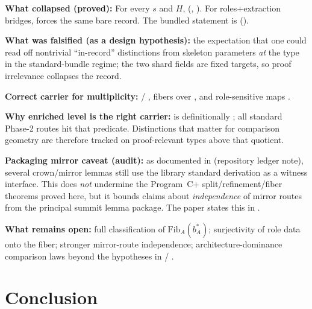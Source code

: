 \documentclass[11pt]{article}
\begin{document}
\begin{sloppypar}
\textbf{What collapsed (proved):} For every  $s$ and  $H$,  (, ). For roles+extraction bridges,  forces the same bare record. The bundled statement is  ().

\textbf{What was falsified (as a design hypothesis):} the expectation that one could read off nontrivial ``in-record'' distinctions from skeleton parameters \emph{at} the type  in the standard-bundle regime; the two  shard fields are fixed targets, so proof irrelevance collapses the record.

\textbf{Correct carrier for multiplicity:}  / , fibers  over , and role-sensitive maps .

\textbf{Why enriched level is the right carrier:}  is definitionally ; all standard Phase-2 routes hit that predicate. Distinctions that matter for comparison geometry are therefore tracked on proof-relevant types above that quotient.

\textbf{Packaging mirror caveat (audit):} as documented in  (repository ledger note), several crown/mirror lemmas still use the library standard derivation as a witness interface. This does \emph{not} undermine the Program~C+ split/refinement/fiber theorems proved here, but it bounds claims about \emph{independence} of mirror routes from the principal summit lemma package. The paper states this in .

\textbf{What remains open:} full classification of $\mathrm{Fib}_A(b^\ast_A)$; surjectivity of role data onto the fiber; stronger mirror-route independence; architecture-dominance comparison laws beyond the hypotheses in  / .
\end{sloppypar}

\section{Conclusion}\label{sec:conclusion}
\end{document}
